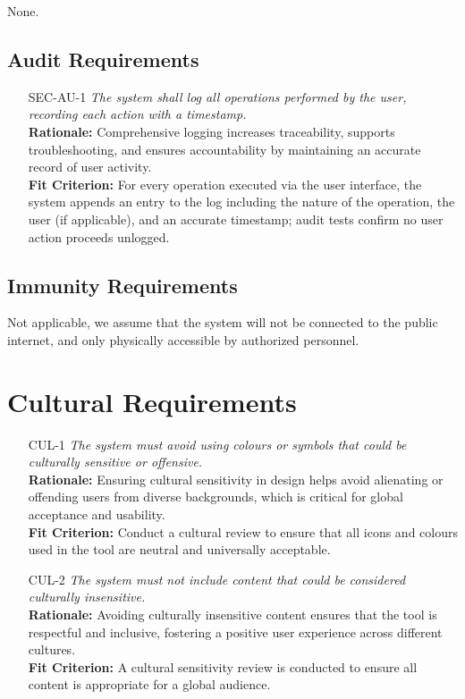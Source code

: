\documentclass[12pt]{article}
\begin{document}
None.

\subsection{Audit Requirements}
\begin{itemize}[leftmargin=*]
  \item[SEC-AU-1] \emph{The system shall log all operations performed by the user,
          recording each action with a timestamp.}\\ \textbf{Rationale:} Comprehensive
        logging increases traceability, supports troubleshooting, and ensures
        accountability by maintaining an accurate record of user activity.\\
        \textbf{Fit Criterion:} For every operation executed via the user interface,
        the system appends an entry to the log including the nature of the operation,
        the user (if applicable), and an accurate timestamp; audit tests confirm no
        user action proceeds unlogged.
\end{itemize}

\subsection{Immunity Requirements}

Not applicable, we assume that the system will not be connected to the public
internet, and only physically accessible by authorized personnel.

\section{Cultural Requirements}
\begin{itemize}[leftmargin=*]
  \item[CUL-1] \emph{The system must avoid using colours or symbols that could be
          culturally sensitive or offensive.}\\ \textbf{Rationale:} Ensuring cultural
        sensitivity in design helps avoid alienating or offending users from diverse
        backgrounds, which is critical for global acceptance and usability.\\
        \textbf{Fit Criterion:} Conduct a cultural review to ensure that all icons and
        colours used in the tool are neutral and universally acceptable.
  \item[CUL-2] \emph{The system must not include content that could be considered
          culturally insensitive.}\\ \textbf{Rationale:} Avoiding culturally insensitive
        content ensures that the tool is respectful and inclusive, fostering a positive
        user experience across different cultures.\\ \textbf{Fit Criterion:} A cultural
        sensitivity review is conducted to ensure all content is appropriate for a
        global audience.
\end{itemize}
\end{document}
